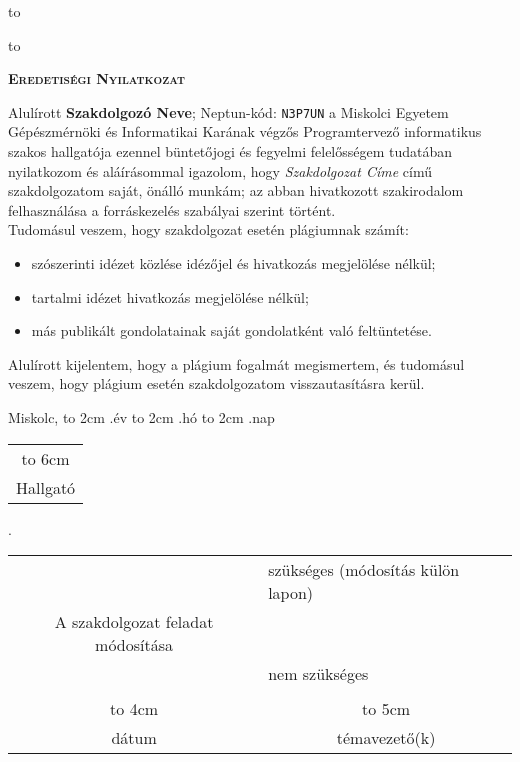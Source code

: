 \hbox to 

\hbox to 

\newpage

\vspace*{1cm}  
\begin{center}
\large\textsc{\bfseries Eredetiségi Nyilatkozat}
\end{center}
\vspace*{2cm}  

Alulírott \textbf{Szakdolgozó Neve}; Neptun-kód: \texttt{N3P7UN} a Miskolci Egyetem Gépészmérnöki és Informatikai Karának végzős Programtervező informatikus szakos hallgatója ezennel büntetőjogi és fegyelmi felelősségem tudatában nyilatkozom és aláírásommal igazolom, hogy \textit{Szakdolgozat Címe}
című szakdolgozatom saját, önálló munkám; az abban hivatkozott szakirodalom
felhasználása a forráskezelés szabályai szerint történt.\\

Tudomásul veszem, hogy szakdolgozat esetén plágiumnak számít:
\begin{itemize}
\item szószerinti idézet közlése idézőjel és hivatkozás megjelölése nélkül;
\item tartalmi idézet hivatkozás megjelölése nélkül;
\item más publikált gondolatainak saját gondolatként való feltüntetése.
\end{itemize}

Alulírott kijelentem, hogy a plágium fogalmát megismertem, és tudomásul veszem, hogy
plágium esetén szakdolgozatom visszautasításra kerül.

\vspace*{3cm}

\noindent Miskolc, \hbox to 2cm{\dotfill} .év \hbox to 2cm{\dotfill} .hó \hbox to 2cm{\dotfill} .nap

\vspace*{3cm}

\hspace*{8cm}\begin{tabular}{c}
\hbox to 6cm{\dotfill}\\
Hallgató
\end{tabular}



\newpage

.

\begin{tabular}{cl}
&szükséges (módosítás külön lapon) \\
A szakdolgozat feladat módosítása& \\
& nem szükséges\\
&\\
\hbox to 4cm{\dotfill}&\multicolumn{1}{c}{\hbox to 5cm{\dotfill}}\\
dátum& \multicolumn{1}{c}{témavezető(k)}
\end{tabular}
\vskip1.5mm

